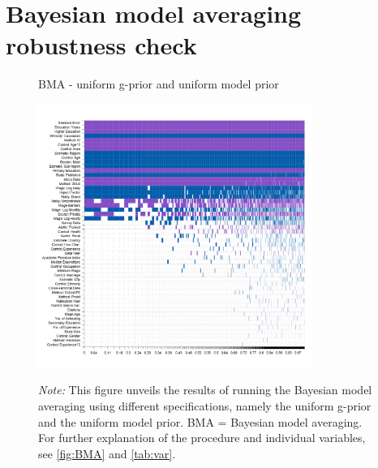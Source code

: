 \chapter{Bayesian model averaging robustness check}
\label{app:three}

\begin{figure}[!htbp]
\begin{center}
\caption{BMA - uniform g-prior and uniform model prior}
\label{fig:BMA2}
\includegraphics[width=0.8\textwidth]{Figures/bma_UIP_uniform_results.png}
\end{center}\vspace{-0.5cm}
\captionsetup{width=0.8\textwidth, font = scriptsize}
\caption*{\emph{Note:} This figure unveils the results of running the Bayesian model averaging using different specifications, namely the uniform g-prior and the uniform model prior. BMA = Bayesian model averaging. For further explanation of the procedure and individual variables, see \autoref{fig:BMA} and \autoref{tab:var}.
}
\end{figure}


